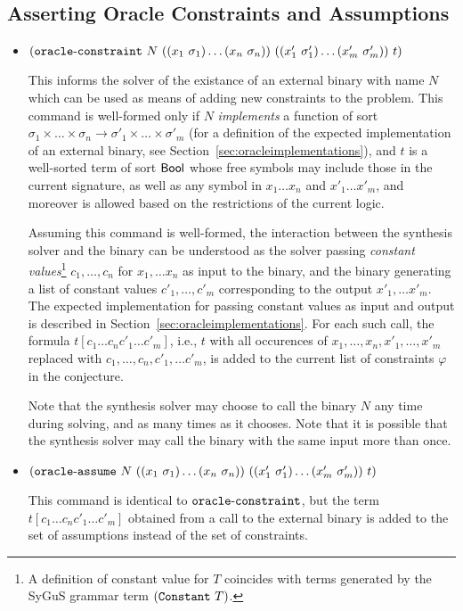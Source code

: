 \documentclass[english,a4paper,10pt]{article}
\begin{document}
\subsection{Asserting Oracle Constraints and Assumptions}
\begin{itemize}
\item ${\tt (}{\tt oracle\mbox{-}constraint}\mbox{ } N \mbox{ } 
{\tt (}{\tt (}x_1\mbox{ }\sigma_1{\tt )} \ldots {\tt (}x_n\mbox{ }\sigma_n{\tt )}{\tt )}\mbox{ }
{\tt (}{\tt (}x'_{1}\mbox{ }\sigma'_{1}{\tt )} \ldots {\tt (}x'_{m}\mbox{ }\sigma'_{m}{\tt )}{\tt )}  \mbox{ } t{\tt )}$

This informs the solver of the existance of an external binary with name $N$
which can be used as means of adding new constraints to the problem.
This command is well-formed only if $N$
\emph{implements} a function of sort $\sigma_1 \times \ldots \times \sigma_n \rightarrow \sigma'_{1} \times \ldots \times \sigma'_{m}$
(for a definition of the expected implementation of an external binary, see Section~\ref{sec:oracleimplementations}),
and $t$ is a well-sorted term of sort $\mathsf{Bool}$ 
whose free symbols may include those in the current signature, as well as any symbol in $x_1 \ldots x_{n}$ and $x'_1 \ldots x'_{m}$,
and moreover is allowed based on the restrictions of the current logic.

Assuming this command is well-formed,
the interaction between the synthesis solver and the binary
can be understood as the solver passing \emph{constant values}\footnote{
A definition of constant value for $T$ coincides with terms generated by the
SyGuS grammar term ${\tt (}{\tt Constant}\mbox{ }T{\tt )}$.
}
$c_1, \ldots, c_n$ for $x_1, \ldots x_n$ as input to the binary,
and the binary generating a list of constant values
$c'_{1}, \ldots, c'_{m}$ corresponding to the output $x'_{1}, \ldots x'_{m}$.
The expected implementation for passing
constant values as input and output 
is described in Section~\ref{sec:oracleimplementations}.
For each such call,
the formula $t[c_1 \ldots c_{n} c'_1 \ldots c'_m]$, i.e., 
$t$ with all occurences of $x_1, \ldots, x_{n}, x'_1, \ldots, x'_m$ replaced with $c_1, \ldots, c_{n}, c'_1, \ldots c'_m$, 
is added to the current list of constraints $\varphi$ in the conjecture.

Note that 
the synthesis solver may choose to call the binary $N$ 
any time during solving, and as many times as it chooses.
Note that it is possible that the synthesis solver may call the binary with
the same input more than once.

\item 
${\tt (}{\tt oracle\mbox{-}assume}\mbox{ } N \mbox{ } 
{\tt (}{\tt (}x_1\mbox{ }\sigma_1{\tt )} \ldots {\tt (}x_n\mbox{ }\sigma_n{\tt )}{\tt )}\mbox{ }
{\tt (}{\tt (}x'_{1}\mbox{ }\sigma'_{1}{\tt )} \ldots {\tt (}x'_{m}\mbox{ }\sigma'_{m}{\tt )}{\tt )}  \mbox{ } t{\tt )}$

This command is identical to ${\tt oracle\mbox{-}constraint}$,
but the term $t[c_1 \ldots c_{n} c'_1 \ldots c'_m]$ obtained from a call to the external binary
is added to the set of assumptions instead of the set of constraints.

\end{itemize}
\end{document}
